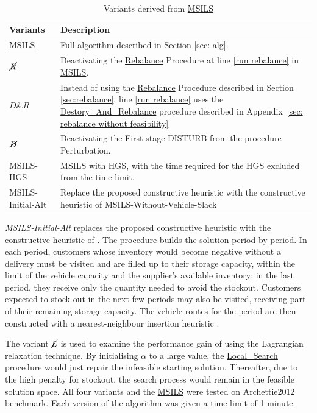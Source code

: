 \documentclass{article}
\begin{document}
\begin{table}\small
\caption{Variants derived from \hyperref[alg:MSILS]{MSILS}}
\label{Variants of MSILS}
\centering
\begin{tabular}{ p{1.5cm}p{10cm}}
\toprule%
\textbf{Variants} & \textbf{Description} \tabularnewline
\hline

\hyperref[alg:MSILS]{MSILS}& Full algorithm described in Section \ref{sec: alg}.  \tabularnewline
$\cancel{R}$ & Deactivating the \hyperref[alg:rebalance]{Rebalance} Procedure at line \ref{run rebalance} in \hyperref[alg:MSILS]{MSILS}. \tabularnewline
$D\&R$ & Instead of using the \hyperref[alg:rebalance]{Rebalance} Procedure described in Section \ref{sec:rebalance}, line \ref{run rebalance} uses the \hyperref[alg: destroy and rebalance]{Destory\_And\_Rebalance} procedure described in Appendix~\ref{sec: rebalance without feasibility}\tabularnewline
$\cancel{D}$ & Deactivating the First-stage DISTURB from the procedure Perturbation. \tabularnewline
MSILS-HGS& MSILS with HGS, with the time required for the HGS excluded from the time limit.\tabularnewline
MSILS-Initial-Alt& Replace the proposed constructive heuristic with
the constructive heuristic of \citet{alvarez2018iterated}
MSILS-Without-Vehicle-Slack \tabularnewline
\hline
\end{tabular}
\end{table}

\textit{MSILS-Initial-Alt} replaces the proposed constructive heuristic with
the constructive heuristic of \citet{alvarez2018iterated}. The procedure
builds the solution period by period. In each period, customers whose
inventory would become negative without a delivery must be visited and are
filled up to their storage capacity, within the limit of the vehicle
capacity and the supplier's available inventory; in the last period, they receive only the quantity needed to avoid
the stockout. Customers expected to stock out in the next few periods may
also be visited, receiving part of their remaining storage capacity. The
vehicle routes for the period are then constructed with a nearest-neighbour
insertion heuristic \cite{braysy2005vehicle}.



The variant $\cancel{L}$ is used to examine the performance gain of using the Lagrangian relaxation technique. By initialising $\alpha$ to a large value, the \hyperref[alg:LocalSearch]{Local\_Search} procedure would just repair the infeasible starting solution. Thereafter, due to the high penalty for stockout, the search process would remain in the feasible solution space. All four variants and the \hyperref[alg:MSILS]{MSILS} were tested on Archettie2012 benchmark. Each version of the algorithm was given a time limit of 1 minute. 
\end{document}
